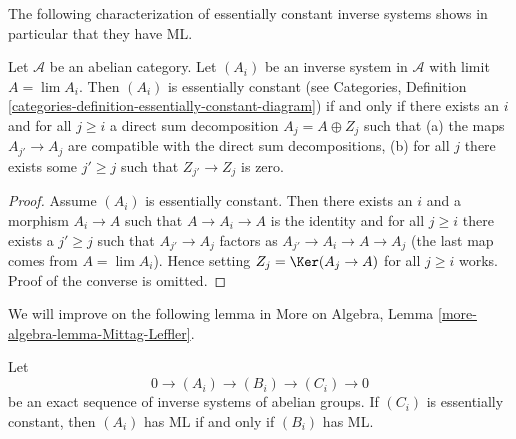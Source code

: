\noindent
The following characterization of essentially constant inverse systems
shows in particular that they have ML.

\begin{lemma}
\label{lemma-essentially-constant}
Let $\mathcal{A}$ be an abelian category.
Let $(A_i)$ be an inverse system in $\mathcal{A}$ with limit $A = \lim A_i$.
Then $(A_i)$ is essentially constant (see
Categories, Definition
\ref{categories-definition-essentially-constant-diagram})
if and only if there exists an $i$ and for all $j \geq i$ a direct sum
decomposition $A_j = A \oplus Z_j$ such that
(a) the maps $A_{j'} \to A_j$ are compatible with the direct sum
decompositions, (b) for all $j$ there exists some $j' \geq j$ such that
$Z_{j'} \to Z_j$ is zero.
\end{lemma}

\begin{proof}
Assume $(A_i)$ is essentially constant. Then there exists an $i$ and
a morphism $A_i \to A$ such that $A \to A_i \to A$ is the identity and
for all $j \geq i$ there exists
a $j' \geq j$ such that $A_{j'} \to A_j$ factors as
$A_{j'} \to A_i \to A \to A_j$ (the last map comes from $A = \lim A_i$).
Hence setting $Z_j = \Ker(A_j \to A)$ for all $j \geq i$ works.
Proof of the converse is omitted.
\end{proof}

\noindent
We will improve on the following lemma in
More on Algebra, Lemma \ref{more-algebra-lemma-Mittag-Leffler}.

\begin{lemma}
\label{lemma-exact-sequence-ML}
Let
$$
0 \to (A_i) \to (B_i) \to (C_i) \to 0
$$
be an exact sequence of inverse systems of abelian groups.
If $(C_i)$ is essentially constant, then $(A_i)$ has ML
if and only if $(B_i)$ has ML.
\end{lemma}

